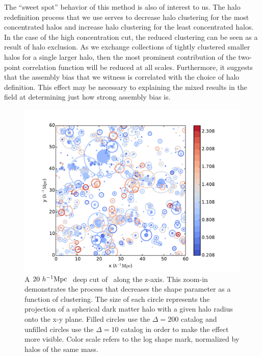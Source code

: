 \documentclass[usenatbib,usegraphicx,letterpaper]{mn2e}
\begin{document}
The ``sweet spot'' behavior of this method is also of interest to us. The halo redefinition process that we use serves to decrease halo clustering for the most concentrated halos and increase halo clustering for the least concentrated halos. In the case of the high concentration cut, the reduced clustering can be seen as a result of halo exclusion. As we exchange collections of tightly clustered smaller halos for a single larger halo, then the most prominent contribution of the two-point correlation function will be reduced at all scales. Furthermore, it suggests that the assembly bias that we witness is correlated with the choice of halo definition. This effect may be necessary to explaining the mixed results in the field at determining just how strong assembly bias is.

\begin{figure}
	\centering
	\includegraphics[width=.9\textwidth]{plotcircles_coolwarm.pdf}
	\caption{A $20 \ h^{-1}\mathrm{Mpc}~$ deep cut of \simB \ along the z-axis. This zoom-in demonstrates the process that decreases the shape parameter as a function of clustering. The size of each circle represents the projection of a spherical dark matter halo with a given halo radius onto the x-y plane. Filled circles use the $\Delta = 200$ catalog and unfilled circles use the $\Delta = 10$ catalog in order to make the effect more visible. Color scale refers to the log shape mark, normalized by halos of the same mass.}
	\label{fig:plotcircles}
\end{figure}

\end{document}
